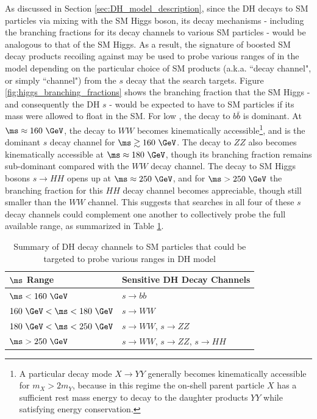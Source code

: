 As discussed in Section \ref{sec:DH_model_description}, since the DH decays to SM particles via mixing with the SM Higgs boson, its decay mechanisms - including the branching fractions for its decay channels to various SM particles - would be analogous to that of the SM Higgs. As a result, the signature of boosted SM decay products recoiling against \met may be used to probe various ranges of \ms in the model depending on the particular choice of SM products (a.k.a. ``decay channel", or simply ``channel") from the \(s\) decay that the search targets. Figure \ref{fig:higgs_branching_fractions} shows the branching fraction that the SM Higgs - and consequently the DH \(s\) - would be expected to have to SM particles if its mass were allowed to float in the SM. For low \ms, the decay to \(b\bar{b}\) is dominant. At \(\ms\approx160~\GeV\), the decay to \(WW\) becomes kinematically accessible\footnote{A particular decay mode \(X\rightarrow YY\) generally becomes kinematically accessible for \(m_X > 2 m_Y\), because in this regime the on-shell parent particle \(X\) has a sufficient rest mass energy to decay to the daughter products \(YY\) while satisfying energy conservation.}, and is the dominant \(s\) decay channel for \(\ms\gtrsim160~\GeV\). The decay to \(ZZ\) also becomes kinematically accessible at \(\ms\approx180~\GeV\), though its branching fraction remains sub-dominant compared with the \(WW\) decay channel. The decay to SM Higgs bosons \(s\rightarrow HH\) opens up at \(\ms \approx 250~\GeV\), and for \(\ms>250~\GeV\) the branching fraction for this \(HH\) decay channel becomes appreciable, though still smaller than the \(WW\) channel. This suggests that searches in all four of these \(s\) decay channels could complement one another to collectively probe the full available \ms range, as summarized in Table \ref{tab:signal_grid_comparison}.

\begin{table}[hp]
\centering
\caption{Summary of DH decay channels to SM particles that could be targeted to probe various \ms ranges in DH model}
\label{tab:signal_grid_comparison}
\begin{tabular}{l l }
\toprule
\textbf{\(\mathbf{\ms}\) Range} & \textbf{Sensitive DH Decay Channels} \\
\midrule
\midrule
\(\ms < 160~\GeV\) & \(s\rightarrow bb\) \\
\midrule
\(160~\GeV < \ms < 180~\GeV\) & \(s\rightarrow WW\) \\
\midrule
\(180~\GeV < \ms < 250~\GeV\) & \(s\rightarrow WW\), \(s\rightarrow ZZ\) \\
\midrule
\(\ms >  250~\GeV\) & \(s\rightarrow WW\), \(s\rightarrow ZZ\), \(s\rightarrow HH\) \\
\bottomrule
\end{tabular}
\end{table}

